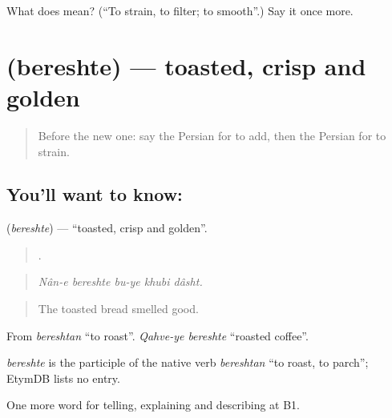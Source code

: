 \begin{tcolorbox}[breakable,colback=teal!4,colframe=teal!35!black,title={Before you move on}]
What does   mean? (\textquotedblleft{}To strain, to filter; to smooth\textquotedblright{}.) Say it once more.
\end{tcolorbox}
\section[\texorpdfstring{\fa{برشته} (bereshte)}{برشته (bereshte)}]{ (bereshte) — toasted, crisp and golden}

\label{lesson:FA-C359-bereshte}



\begin{quote}
Before the new one: say the Persian for to add, then the Persian for to strain.
\end{quote}

\subsection*{You'll want to know: }
\textbf{} (\emph{bereshte}) — \textquotedblleft{}toasted, crisp and golden\textquotedblright{}.

\begin{quote}
    .
\end{quote}

\begin{quote}
\emph{Nân-e bereshte bu-ye khubi dâsht.}
\end{quote}

\begin{quote}
The toasted bread smelled good.
\end{quote}

From \emph{bereshtan} \textquotedblleft{}to roast\textquotedblright{}. \emph{Qahve-ye bereshte} \textquotedblleft{}roasted coffee\textquotedblright{}.

\begin{cousinweb}
\emph{bereshte} is the participle of the native verb \emph{bereshtan} \textquotedblleft{}to roast, to parch\textquotedblright{}; EtymDB lists no entry.
\end{cousinweb}

\begin{grammarlens}[title={What you've built}]
One more word for telling, explaining and describing at B1.
\end{grammarlens}

